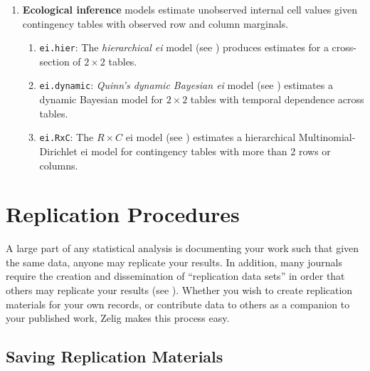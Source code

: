 \begin{enumerate}
\item {\bf Ecological inference} models estimate unobserved internal
cell values given contingency tables with observed row and column
marginals.  
\begin{enumerate}
\item {\tt ei.hier}: The {\it hierarchical {\sc ei}} model
(see ) produces estimates for a cross-section of $2 \times 2$
tables.   
\item {\tt ei.dynamic}: {\it Quinn's dynamic Bayesian {\sc ei}} model (see
) estimates a dynamic Bayesian model for $2 \times 2$
tables with temporal dependence across tables.
\item {\tt ei.RxC}: The $R \times C$ {\sc ei} model (see )
estimates a hierarchical Multinomial-Dirichlet {\sc ei} model for
contingency tables with more than 2 rows or columns.  
\end{enumerate}


\end{enumerate}

\section{Replication Procedures} 

A large part of any statistical analysis is documenting your work such
that given the same data, anyone may replicate your results.  In
addition, many journals require the creation and dissemination of
``replication data sets'' in order that others may replicate your
results (see \nocite{King95}).
Whether you wish to create replication materials for your own records,
or contribute data to others as a companion to your published work,
Zelig makes this process easy.

\subsection{Saving Replication Materials}

